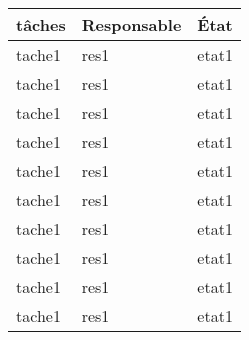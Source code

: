 \Large\begin{tabularx}{\linewidth}{
    |>{\hsize=1.95\hsize}X|%
    >{\hsize=0.7\hsize}X|%
    >{\hsize=0.35\hsize}X|%
  }
    \hline
    tâches & Responsable & État\\\hline
    tache1 & res1 & etat1\\\hline
    tache1 & res1 & etat1\\\hline
    tache1 & res1 & etat1\\\hline
    tache1 & res1 & etat1\\\hline
    tache1 & res1 & etat1\\\hline
    tache1 & res1 & etat1\\\hline
    tache1 & res1 & etat1\\\hline
    tache1 & res1 & etat1\\\hline
    tache1 & res1 & etat1\\\hline
    tache1 & res1 & etat1\\\hline
  \end{tabularx}
     